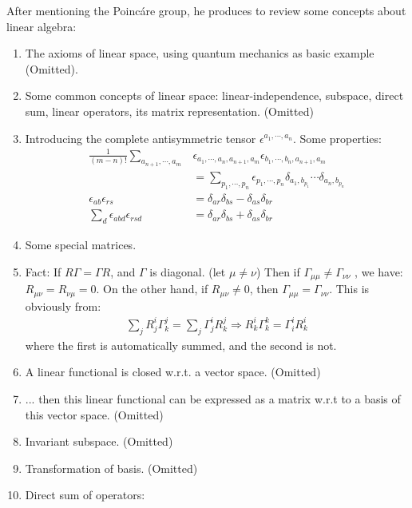 After mentioning the Poinc\'{a}re group, he produces to review some
concepts about linear algebra:
\begin{enumerate}
    \item The axioms of linear space, using quantum mechanics
        as basic example (Omitted).
    \item Some common concepts of linear space: linear-independence,
        subspace, direct sum, linear operators, its matrix representation. (Omitted)
    \item Introducing the complete antisymmetric tensor 
        $\epsilon^{a_1,\cdots,a_n}$. Some properties:
        \begin{align}
            \frac{1}{(m-n)!} \sum_{a_{n+1},\cdots, a_m}
            & \epsilon_{a_1,\cdots,a_n,a_{n+1},a_m}
            \epsilon_{b_1,\cdots,b_n,a_{n+1},a_m}\nonumber
            \\
            &= \sum_{p_1,\cdots,p_n} 
            \epsilon_{p_1,\cdots,p_n} 
                \delta_{a_1,b_{p_1}}\cdots \delta_{a_n,b_{p_n}}
                \\
            \epsilon_{ab}\epsilon_{rs} &=
                \delta_{ar}\delta_{bs}-\delta_{as}\delta_{br}
                \\
            \sum_d\epsilon_{abd}\epsilon_{rsd} &=
                \delta_{ar}\delta_{bs} + \delta_{as}\delta_{br}
        \end{align}
    \item Some special matrices.
    \item Fact: If $R\Gamma = \Gamma R$, and 
        $\Gamma$ is diagonal. (let $\mu\neq\nu$) Then if 
        $\Gamma_{\mu\mu} \neq \Gamma_{\nu\nu}$ , we have:
        $ R_{\mu\nu}=R_{\nu\mu} = 0 $.
        On the other hand, if $R_{\mu\nu}\neq 0$, then
        $\Gamma_{\mu\mu}=\Gamma_{\nu\nu}$.
        This is obviously from:
        \begin{align*}
            \sum_j R^{i}_{j}\Gamma^{j}_{k}=\sum_j\Gamma^{i}_{j} R^{j}_k
            \Longrightarrow
            R^i_k\Gamma^k_k = \Gamma^i_i R^i_k
        \end{align*}
        where the first is automatically summed, and the second is not.

    \item A linear functional is closed w.r.t. a vector space. (Omitted)
    \item ... then this linear functional can be expressed as a
        matrix w.r.t to a basis of this vector space. (Omitted)
    \item Invariant subspace. (Omitted)
    \item Transformation of basis. (Omitted)
    \item Direct sum of operators:


\end{enumerate}
